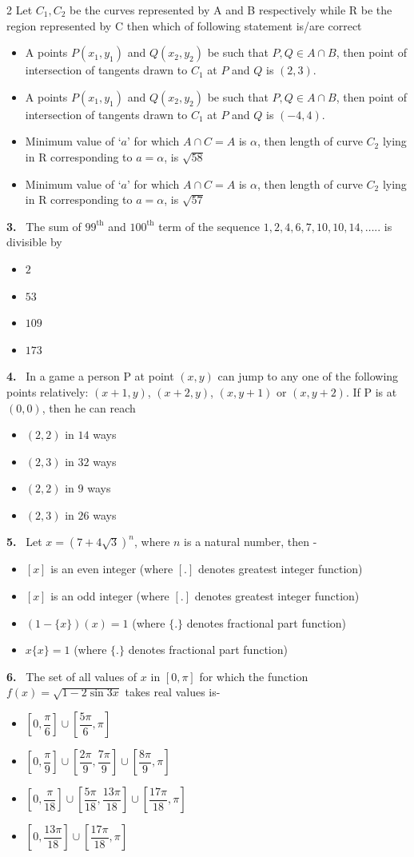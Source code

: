 \documentclass[10pt]{extarticle}
\newcommand{\qn}[1]{\par\smallskip\noindent\textbf{#1.}~}
\newenvironment{qoptions}{\begin{itemize}[leftmargin=1.8em,itemsep=1pt,topsep=2pt,label={}]}{\end{itemize}}
\newcommand{\opt}[2]{\item[(#1)] #2}
\begin{document}
\begin{multicols}{2}
Let $C_1,C_2$ be the curves represented by A and B respectively while R be the region represented by C then which of following statement is/are correct
\begin{qoptions}
\opt{A}{A points $P(x_1,y_1)$ and $Q(x_2,y_2)$ be such that $P,Q\in A\cap B$, then point of intersection of tangents drawn to $C_1$ at $P$ and $Q$ is $(2,3)$.}
\opt{B}{A points $P(x_1,y_1)$ and $Q(x_2,y_2)$ be such that $P,Q\in A\cap B$, then point of intersection of tangents drawn to $C_1$ at $P$ and $Q$ is $(-4,4)$.}
\opt{C}{Minimum value of `$a$' for which $A\cap C=A$ is $\alpha$, then length of curve $C_2$ lying in R corresponding to $a=\alpha$, is $\sqrt{58}$}
\opt{D}{Minimum value of `$a$' for which $A\cap C=A$ is $\alpha$, then length of curve $C_2$ lying in R corresponding to $a=\alpha$, is $\sqrt{57}$}
\end{qoptions}
\qn{3} The sum of $99^{\mathrm{th}}$ and $100^{\mathrm{th}}$ term of the sequence $1,2,4,6,7,10,10,14,\ldots..$ is divisible by
\begin{qoptions}
\opt{A}{$2$}
\opt{B}{$53$}
\opt{C}{$109$}
\opt{D}{$173$}
\end{qoptions}
\qn{4} In a game a person P at point $(x,y)$ can jump to any one of the following points relatively: $(x+1,y)$, $(x+2,y)$, $(x,y+1)$ or $(x,y+2)$. If P is at $(0,0)$, then he can reach
\begin{qoptions}
\opt{A}{$(2,2)$ in $14$ ways}
\opt{B}{$(2,3)$ in $32$ ways}
\opt{C}{$(2,2)$ in $9$ ways}
\opt{D}{$(2,3)$ in $26$ ways}
\end{qoptions}
\qn{5} Let $x=\left(7+4\sqrt3\right)^n$, where $n$ is a natural number, then -
\begin{qoptions}
\opt{A}{$[x]$ is an even integer (where $[.]$ denotes greatest integer function)}
\opt{B}{$[x]$ is an odd integer (where $[.]$ denotes greatest integer function)}
\opt{C}{$(1-\{x\})(x)=1$ (where $\{.\}$ denotes fractional part function)}
\opt{D}{$x\{x\}=1$ (where $\{.\}$ denotes fractional part function)}
\end{qoptions}
\qn{6} The set of all values of $x$ in $[0,\pi]$ for which the function $f(x)=\sqrt{1-2\sin3x}$ takes real values is-
\begin{qoptions}
\opt{A}{$\left[0,\dfrac\pi6\right]\cup\left[\dfrac{5\pi}{6},\pi\right]$}
\opt{B}{$\left[0,\dfrac\pi9\right]\cup\left[\dfrac{2\pi}{9},\dfrac{7\pi}{9}\right]\cup\left[\dfrac{8\pi}{9},\pi\right]$}
\opt{C}{$\left[0,\dfrac{\pi}{18}\right]\cup\left[\dfrac{5\pi}{18},\dfrac{13\pi}{18}\right]\cup\left[\dfrac{17\pi}{18},\pi\right]$}
\opt{D}{$\left[0,\dfrac{13\pi}{18}\right]\cup\left[\dfrac{17\pi}{18},\pi\right]$}

\end{qoptions}
\end{multicols}
\end{document}
